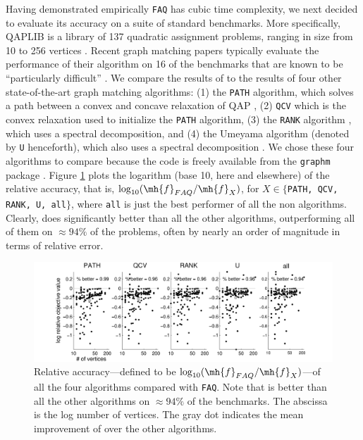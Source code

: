 \documentclass[11pt]{article}
\begin{document}
Having demonstrated empirically \texttt{FAQ} has cubic time complexity, we next decided to evaluate its accuracy on a suite of standard benchmarks.  More specifically, QAPLIB is a library of 137 quadratic assignment problems, ranging in size from 10 to 256 vertices \cite{Burkard1997}.  Recent graph matching papers typically evaluate the performance of their algorithm on 16 of the benchmarks that are known to be ``particularly difficult'' \cite{Zaslavskiy2009,Schellewald2001}.  We compare the results of \FAQ to the results of four other state-of-the-art graph matching algorithms: (1) the \texttt{PATH} algorithm, which solves a path between a convex and concave relaxation of QAP \cite{Zaslavskiy2009}, (2) \texttt{QCV} which is the convex relaxation used to initialize the \texttt{PATH} algorithm, (3) the \texttt{RANK} algorithm \cite{Singh2007}, which uses a spectral decomposition, and (4)  the Umeyama algorithm (denoted by \texttt{U} henceforth), which also uses a spectral decomposition \cite{Umeyama1988}.  We chose these four algorithms to compare because the code is freely available from the \texttt{graphm} package \cite{Zaslavskiy2009}.  
Figure \ref{fig:allRelAccuracy} plots the logarithm (base 10, here and elsewhere) of the relative accuracy, that is, $\log_{10}(\mh{f}_{FAQ}/\mh{f}_X)$, for $X \in \{$\texttt{PATH, QCV, RANK, U, all}$\}$, where \texttt{all} is just the best performer of all the non \FAQ algorithms.  Clearly, \FAQ does significantly better than all the other algorithms, outperforming all of them on $\approx 94\%$ of the problems, often by nearly an order of magnitude in terms of relative error.

\begin{figure}[htbp]
	\centering
		\includegraphics[width=1.0\linewidth]{../figs/allRelAccuracy.pdf}
	\caption{Relative accuracy---defined to be $\log_{10}(\mh{f}_{FAQ}/\mh{f}_X)$---of all the four algorithms compared with \texttt{FAQ}.  Note that \FAQ is better than all the other algorithms on $\approx 94\%$ of the benchmarks. The abscissa is the log number of vertices.  The gray dot indicates the mean improvement of \FAQ over the other algorithms.}
	\label{fig:allRelAccuracy}
\end{figure}
\end{document}
